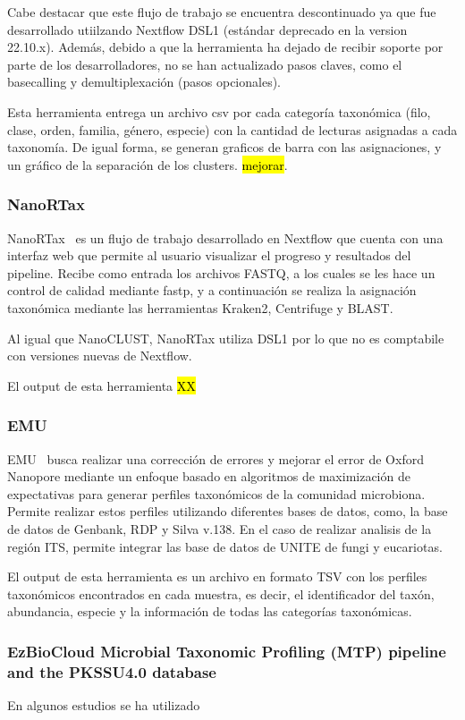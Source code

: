 Cabe destacar que este flujo de trabajo se encuentra descontinuado ya que fue desarrollado utiilzando Nextflow DSL1 (estándar deprecado en la version 22.10.x). Además, debido a que la herramienta ha dejado de recibir soporte por parte de los desarrolladores, no se han actualizado pasos claves, como el basecalling y demultiplexación (pasos opcionales).

Esta herramienta entrega un archivo csv por cada categoría taxonómica (filo, clase, orden, familia, género, especie) con la cantidad de lecturas asignadas a cada taxonomía. De igual forma, se generan graficos de barra con las asignaciones, y un gráfico de la separación de los clusters. \hl{mejorar}. 
\subsubsection{NanoRTax}

NanoRTax~\cite{RODRIGUEZPEREZ20225350} es un flujo de trabajo desarrollado en Nextflow que cuenta con una interfaz web que permite al usuario visualizar el progreso y resultados del pipeline.
Recibe como entrada los archivos FASTQ, a los cuales se les hace un control de calidad mediante fastp, y a continuación se realiza la asignación taxonómica mediante las herramientas Kraken2, Centrifuge y BLAST. 

Al igual que NanoCLUST, NanoRTax utiliza DSL1 por lo que no es comptabile con versiones nuevas de Nextflow.

El output de esta herramienta \hl{XX}
\subsubsection{EMU}
EMU~\cite{curry2022emu} busca realizar una corrección de errores y mejorar el error de Oxford Nanopore mediante un enfoque basado en algoritmos de maximización de expectativas para generar perfiles taxonómicos de la comunidad microbiona. Permite realizar estos perfiles utilizando diferentes bases de datos, como, la base de datos de Genbank,  RDP y Silva v.138. En el caso de realizar analisis de la región ITS, permite integrar las base de datos de UNITE de fungi y eucariotas.

El output de esta herramienta es un archivo en formato TSV con los perfiles taxonómicos encontrados en cada muestra, es decir, el identificador del taxón, abundancia, especie y la información de todas las categorías taxonómicas. 

\subsubsection{EzBioCloud Microbial Taxonomic Profiling (MTP) pipeline and the PKSSU4.0 database}
En algunos estudios se ha utilizado %

